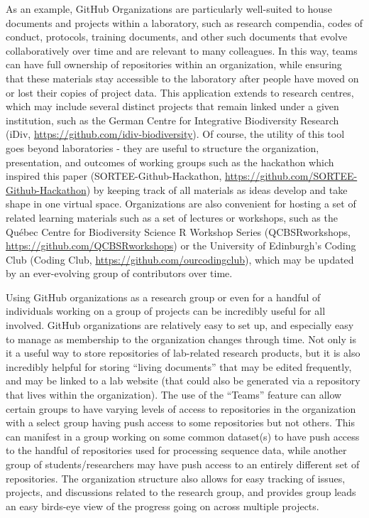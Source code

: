 As an example, GitHub Organizations are particularly well-suited to house documents and projects within a laboratory, such as research compendia, codes of conduct, protocols, training documents, and other such documents that evolve collaboratively over time and are relevant to many colleagues.
In this way, teams can have full ownership of repositories within an organization, while ensuring that these materials stay accessible to the laboratory after people have moved on or lost their copies of project data.
This application extends to research centres, which may include several distinct projects that remain linked under a given institution, such as the German Centre for Integrative Biodiversity Research (iDiv, \url{https://github.com/idiv-biodiversity}).
Of course, the utility of this tool goes beyond laboratories - they are useful to structure the organization, presentation, and outcomes of working groups such as the hackathon which inspired this paper (SORTEE-Github-Hackathon, \url{https://github.com/SORTEE-Github-Hackathon}) by keeping track of all materials as ideas develop and take shape in one virtual space.
Organizations are also convenient for hosting a set of related learning materials such as a set of lectures or workshops, such as the Québec Centre for Biodiversity Science R Workshop Series (QCBSRworkshops, \url{https://github.com/QCBSRworkshops}) or the University of Edinburgh's Coding Club (Coding Club, \url{https://github.com/ourcodingclub}), which may be updated by an ever-evolving group of contributors over time.

Using GitHub organizations as a research group or even for a handful of individuals working on a group of projects can be incredibly useful for all involved.
GitHub organizations are relatively easy to set up, and especially easy to manage as membership to the organization changes through time.
Not only is it a useful way to store repositories of lab-related research products, but it is also incredibly helpful for storing ``living documents'' that may be edited frequently, and may be linked to a lab website (that could also be generated via a repository that lives within the organization).
The use of the ``Teams'' feature can allow certain groups to have varying levels of access to repositories in the organization with a select group having push access to some repositories but not others.
This can manifest in a group working on some common dataset(s) to have push access to the handful of repositories used for processing sequence data, while another group of students/researchers may have push access to an entirely different set of repositories.
The organization structure also allows for easy tracking of issues, projects, and discussions related to the research group, and provides group leads an easy birds-eye view of the progress going on across multiple projects.

